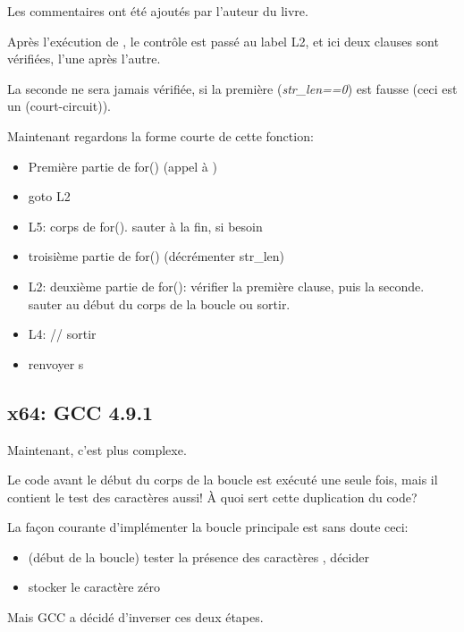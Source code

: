 

Les commentaires ont été ajoutés par l'auteur du livre.

Après l'exécution de \strlen{}, le contrôle est passé au label L2, et ici deux clauses
sont vérifiées, l'une après l'autre.

La seconde ne sera jamais vérifiée, si la première (\emph{str\_len==0}) est fausse
(ceci est un  (court-circuit)).

Maintenant regardons la forme courte de cette fonction:

\begin{itemize}
\item Première partie de for() (appel à \strlen{})
\item goto L2
\item L5: corps de for(). sauter à la fin, si besoin
\item troisième partie de for() (décrémenter str\_len)
\item L2: 
deuxième partie de for(): vérifier la première clause, puis la seconde. sauter au
début du corps de la boucle ou sortir.
\item L4: // sortir
\item renvoyer s
\end{itemize}

\subsection{x64: GCC 4.9.1 \Optimizing}
\label{string_trim_GCC_x64_O3}



Maintenant, c'est plus complexe.

Le code avant le début du corps de la boucle est exécuté une seule fois, mais il contient
le test des caractères \CRLF{} aussi!
À quoi sert cette duplication du code?

La façon courante d'implémenter la boucle principale est sans doute ceci:

\begin{itemize}
\item (début de la boucle) tester la présence des caractères \CRLF{}, décider
\item stocker le caractère zéro
\end{itemize}

Mais GCC a décidé d'inverser ces deux étapes.


